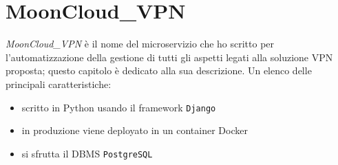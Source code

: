 \chapter{MoonCloud\_VPN}\label{ch:microservice}
\textit{MoonCloud\_VPN} è il nome del microservizio
che ho scritto per l'automatizzazione della gestione di tutti gli aspetti legati
alla soluzione VPN proposta; questo capitolo è dedicato alla sua descrizione.
Un elenco delle principali caratteristiche:
\begin{itemize}
  \item scritto in Python usando il framework \texttt{Django}
  \item in produzione viene deployato in un container Docker
  \item si sfrutta il DBMS \texttt{PostgreSQL}
\end{itemize}






